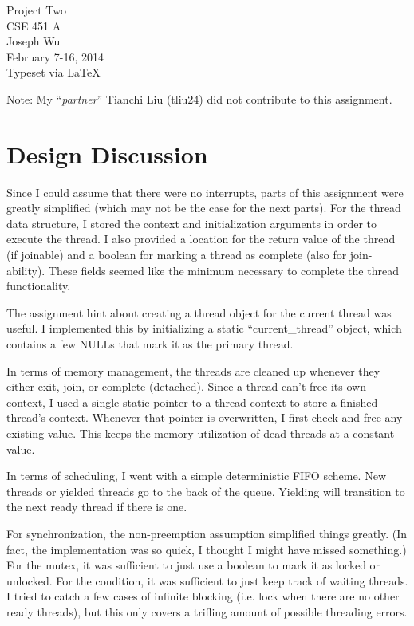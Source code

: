 \documentclass[a4paper, 12pt]{report}
\begin{document}
    \begin{center}
        {\LARGE Project Two} \\
        CSE 451 A \\
        Joseph Wu  \\
        February 7-16, 2014 \\
        {\tiny Typeset via \LaTeX}
    \end{center}

Note: My ``\textit{partner}'' Tianchi Liu (tliu24) did not contribute to this assignment.

\section{Design Discussion}
    Since I could assume that there were no interrupts, 
        parts of this assignment were greatly simplified 
        (which may not be the case for the next parts).  
    For the thread data structure, 
        I stored the context and initialization arguments in order to execute the thread.
    I also provided a location for the return value of the thread (if joinable)
        and a boolean for marking a thread as complete (also for join-ability).
    These fields seemed like the minimum necessary to complete the thread functionality.
    
    The assignment hint about creating a thread object for the current thread was useful.
    I implemented this by initializing a static ``current\_thread'' object, 
        which contains a few NULLs that mark it as the primary thread.  
    
    In terms of memory management, 
        the threads are cleaned up whenever they either exit, join, or complete (detached).  
    Since a thread can't free its own context, 
        I used a single static pointer to a thread context to store a finished thread's context.
    Whenever that pointer is overwritten, I first check and free any existing value.  
    This keeps the memory utilization of dead threads at a constant value.  
    
    In terms of scheduling, 
        I went with a simple deterministic FIFO scheme.  
    New threads or yielded threads go to the back of the queue.
    Yielding will transition to the next ready thread if there is one.  
    
    For synchronization, the non-preemption assumption simplified things greatly.
    (In fact, the implementation was so quick, I thought I might have missed something.)
    For the mutex, it was sufficient to just use a boolean to mark it as locked or unlocked.
    For the condition, it was sufficient to just keep track of waiting threads.  
    I tried to catch a few cases of infinite blocking 
        (i.e. lock when there are no other ready threads),
        but this only covers a trifling amount of possible threading errors.  
\end{document}
